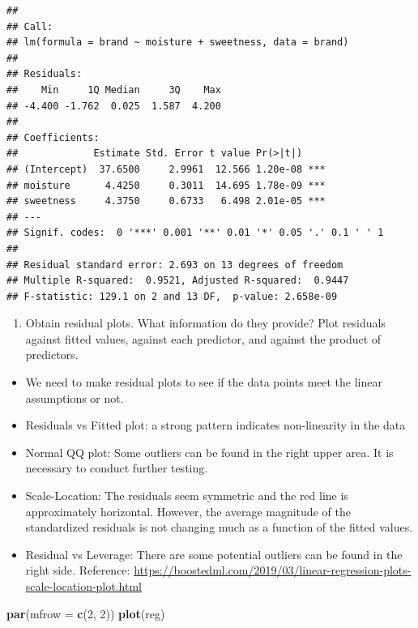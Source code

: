 \documentclass[
]{article}
\newenvironment{Shaded}{\begin{snugshade}}{\end{snugshade}}
\newcommand{\DataTypeTok}[1]{\textcolor[rgb]{0.13,0.29,0.53}{#1}}
\newcommand{\DecValTok}[1]{\textcolor[rgb]{0.00,0.00,0.81}{#1}}
\newcommand{\KeywordTok}[1]{\textcolor[rgb]{0.13,0.29,0.53}{\textbf{#1}}}
\newcommand{\NormalTok}[1]{#1}
\providecommand{\tightlist}{%
  \setlength{\itemsep}{0pt}\setlength{\parskip}{0pt}}
\begin{document}
\begin{verbatim}
## 
## Call:
## lm(formula = brand ~ moisture + sweetness, data = brand)
## 
## Residuals:
##    Min     1Q Median     3Q    Max 
## -4.400 -1.762  0.025  1.587  4.200 
## 
## Coefficients:
##             Estimate Std. Error t value Pr(>|t|)    
## (Intercept)  37.6500     2.9961  12.566 1.20e-08 ***
## moisture      4.4250     0.3011  14.695 1.78e-09 ***
## sweetness     4.3750     0.6733   6.498 2.01e-05 ***
## ---
## Signif. codes:  0 '***' 0.001 '**' 0.01 '*' 0.05 '.' 0.1 ' ' 1
## 
## Residual standard error: 2.693 on 13 degrees of freedom
## Multiple R-squared:  0.9521, Adjusted R-squared:  0.9447 
## F-statistic: 129.1 on 2 and 13 DF,  p-value: 2.658e-09
\end{verbatim}

\begin{enumerate}
\def\labelenumi{(\alph{enumi})}
\setcounter{enumi}{1}
\tightlist
\item
  Obtain residual plots. What information do they provide? Plot
  residuals against fitted values, against each predictor, and against
  the product of predictors.
\end{enumerate}

\begin{itemize}
\tightlist
\item
  We need to make residual plots to see if the data points meet the
  linear assumptions or not.
\item
  Residuals vs Fitted plot: a strong pattern indicates non-linearity in
  the data
\item
  Normal QQ plot: Some outliers can be found in the right upper area. It
  is necessary to conduct further testing.
\item
  Scale-Location: The residuals seem symmetric and the red line is
  approximately horizontal. However, the average magnitude of the
  standardized residuals is not changing much as a function of the
  fitted values.
\item
  Residual vs Leverage: There are some potential outliers can be found
  in the right side. Reference:
  \url{https://boostedml.com/2019/03/linear-regression-plots-scale-location-plot.html}
\end{itemize}

\begin{Shaded}
\begin{Highlighting}[]
\KeywordTok{par}\NormalTok{(}\DataTypeTok{mfrow =} \KeywordTok{c}\NormalTok{(}\DecValTok{2}\NormalTok{, }\DecValTok{2}\NormalTok{))}
\KeywordTok{plot}\NormalTok{(reg)}
\end{Highlighting}
\end{Shaded}
\end{document}

